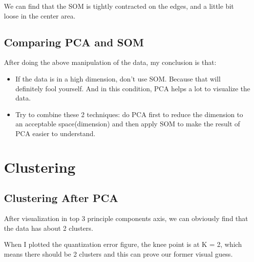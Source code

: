 \documentclass[titlepage,a4paper,12pt,thmsb]{report}
\begin{document}
\begin{center}
\begin{figure}[h]
{\par}
\end{figure}
{}
\end{center}

\begin{center}
\begin{figure}[h]
{\par}
\end{figure}
{}
\end{center}

We can find that the SOM is tightly contracted on the edges, and a little bit loose in the center area.


\newpage

\subsection{Comparing PCA and SOM}

After doing the above manipulation of the data, my conclusion is that:

\begin{itemize}
\item{If the data is in a high dimension, don't use SOM. Because that will definitely fool yourself. And in this condition, PCA helps a lot to visualize the data.}
\item{Try to combine these 2 techniques: do PCA first to reduce the dimension to an acceptable space(dimension) and then apply SOM to make the result of PCA easier to understand.}
\end{itemize}

\newpage

\section{Clustering}
\subsection{Clustering After PCA}

After visualization in top 3 principle components axis, we can obviously find that the data has about 2 clusters.

When I plotted the quantization error figure, the knee point is at K = 2, which means there should be 2 clusters and this can prove our former visual guess.
\end{document}
